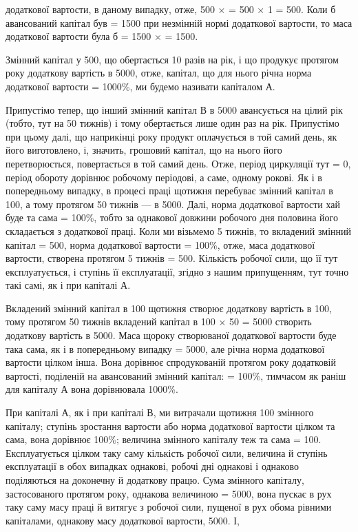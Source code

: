 \parcont{}  %
додаткової вартости, в даному випадку, отже, 500 ×  = 500 × 1 = 500. Коли б
авансований капітал був = 1500 при незмінній
нормі додаткової вартости, то маса додаткової вартости була б =
1500 ×  = 1500.

Змінний капітал у 500, що обертається 10 разів на рік, і
що продукує протягом року додаткову вартість в 5000, отже,
капітал, що для нього річна норма додаткової вартости = 1000\%, ми
будемо називати капіталом А.

Припустімо тепер, що інший змінний капітал В в 5000
авансується на цілий рік (тобто, тут на 50 тижнів) і тому обертається
лише один раз на рік. Припустімо при цьому далі, що наприкінці року
продукт оплачується в той самий день, як його виготовлено, і, значить,
грошовий капітал, що на нього його перетворюється, повертається в той
самий день. Отже, період циркуляції тут = 0, період обороту дорівнює
робочому періодові, а саме, одному рокові. Як і в попередньому випадку,
в процесі праці щотижня перебуває змінний капітал в 100,
а тому протягом 50 тижнів — в 5000. Далі, норма додаткової
вартости хай буде та сама = 100\%, тобто за однакової довжини робочого
дня половина його складається з додаткової праці. Коли ми візьмемо
5 тижнів, то вкладений змінний капітал = 500, норма додаткової
вартости = 100\%, отже, маса додаткової вартости, створена протягом
5 тижнів = 500. Кількість робочої сили, що її тут експлуатується,
і ступінь її експлуатації, згідно з нашим припущенням, тут
точно такі самі, як і при капіталі А.

Вкладений змінний капітал в 100 щотижня створює додаткову
вартість в 100, тому протягом 50 тижнів вкладений капітал
в 100 × 50 = 5000 створить додаткову вартість в 5000. Маса щороку створюваної
додаткової вартости буде така сама, як і в попередньому випадку = 5000, але річна норма
додаткової
вартости цілком інша. Вона дорівнює спродукованій протягом року
додатковій вартості, поділеній на авансований змінний капітал:
 = 100\%, тимчасом як раніш для капіталу А вона дорівнювала 1000\%.

При капіталі А, як і при капіталі В, ми витрачали щотижня 100 змінного капіталу; ступінь
зростання вартости або норма додаткової
вартости цілком та сама, вона дорівнює 100\%; величина змінного
капіталу теж та сама = 100. Експлуатується цілком таку
саму кількість робочої сили, величина й ступінь експлуатації в обох випадках
однакові, робочі дні однакові і однаково поділяються на доконечну
й додаткову працю. Сума змінного капіталу, застосованого протягом
року, однакова величиною = 5000, вона пускає в рух таку
саму масу праці й витягує з робочої сили, пущеної в рух обома рівними
капіталами, однакову масу додаткової вартости, 5000. І,
\parbreak{}  %
